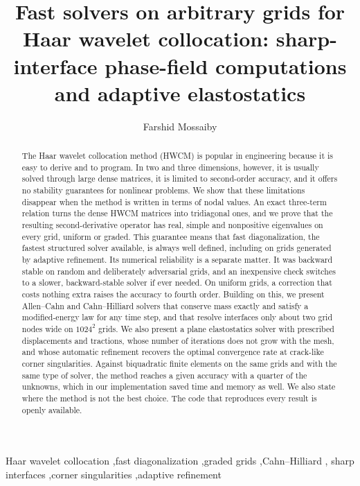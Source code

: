 \documentclass[preprint,12pt]{elsarticle}
\theoremstyle{remark}
\begin{document}
\begin{frontmatter}
\title{Fast solvers on arbitrary grids for Haar wavelet collocation:
sharp-interface phase-field computations and adaptive elastostatics}

\author[inst1]{Farshid Mossaiby}

\begin{abstract}
The Haar wavelet collocation method (HWCM) is popular in engineering because it is easy to derive and
to program. In two and three dimensions, however, it is usually solved through large dense matrices, it
is limited to second-order accuracy, and it offers no stability guarantees for nonlinear problems. We
show that these limitations disappear when the method is written in terms of nodal values. An exact
three-term relation turns the dense HWCM matrices into tridiagonal ones, and we prove that the resulting
second-derivative operator has real, simple and nonpositive eigenvalues on every grid, uniform or
graded. This guarantee means that fast diagonalization, the fastest structured solver available, is always well
defined, including on grids generated by adaptive refinement. Its numerical reliability is a separate
matter. It was backward stable on random and deliberately adversarial grids, and an inexpensive check
switches to a slower, backward-stable solver if ever needed. On uniform grids, a correction that costs nothing
extra raises the accuracy to fourth order. Building on this, we present Allen--Cahn and Cahn--Hilliard
solvers that conserve mass exactly and satisfy a modified-energy law for any time step, and that resolve interfaces
only about two grid nodes wide on $1024^2$ grids. We also present a plane elastostatics solver with
prescribed displacements and tractions, whose number of iterations does not grow with the mesh, and
whose automatic refinement recovers the optimal convergence rate at crack-like corner singularities.
Against biquadratic finite elements on the same grids and with the same type of solver, the method reaches
a given accuracy with a quarter of the unknowns, which in our implementation saved time and memory as well. We also state where the method is not the best choice. The code that reproduces every result is
openly available.
\end{abstract}

\begin{keyword}
Haar wavelet collocation \sep fast diagonalization \sep graded grids \sep Cahn--Hilliard \sep
sharp interfaces \sep corner singularities \sep adaptive refinement
\end{keyword}
\end{frontmatter}
\end{document}
